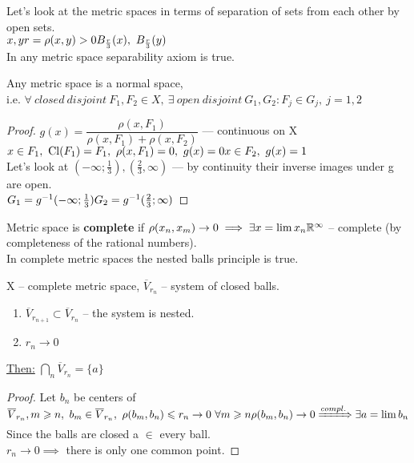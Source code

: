 Let's look at the metric spaces in terms of separation of sets from each other by open sets. \\
$x, y \\
r = \rho(x, y) > 0 \\
B_{\frac{r}{3}}(x),\ B_{\frac{r}{3}}(y)$ \\
In any metric space separability axiom is true.
\begin{thm}
  Any metric space is a normal space, \\i.e.
  $\forall\ closed\ disjoint\ F_1, F_2 \in X,\ \exists\ open\ disjoint\ G_1, G_2\colon F_j \in G_j,\ j = 1, 2$
\end{thm}
\begin{proof}
  $g(x) = \dfrac{\rho(x, F_1)}{\rho(x, F_1) + \rho(x, F_2)}$ --- continuous on X \\
  $x \in F_1,\ \operatorname{Cl}({F_1}) = F_1,\ \rho(x, F_1) = 0,\ g(x) = 0 \\
  x \in F_2,\ g(x) = 1$ \\
  Let's look at $(-\infty; \frac{1}{3}), (\frac{2}{3}, \infty)$ --- by continuity their inverse images under g are open. \\
  $G_1 = g^{-1}(-\infty; \frac{1}{3}) \\
  G_2 = g^{-1}(\frac{2}{3}; \infty)$
\end{proof}
\begin{defn}
  Metric space is \textbf{complete} if $\rho(x_n, x_m) \to 0 \implies \exists x = \lim x_n \\
  \mathbb{R}^\infty$ -- complete (by completeness of the rational numbers). \\
  In complete metric spaces the nested balls principle is true.
\end{defn}
\begin{thm}
  X -- complete metric space, $\overline{V}_{r_n}$ -- system of closed balls.
  \begin{enumerate}
      \item $\overline{V}_{r_{n + 1}} \subset \overline{V}_{r_n}$ -- the system is nested.
      \item $r_n \to 0$
    \end{enumerate}
  \underline{Then:} $\bigcap\limits_n \overline{V}_{r_n} = \{a\}$
\end{thm}
\begin{proof}
  Let $b_n$ be centers of $\overline{V}_{r_n}, \\
  m \geq n,\ b_m \in \overline{V}_{r_n},\ \rho(b_m, b_n) \leq r_n \to 0\ \forall m \geq n \\
  \rho(b_m, b_n) \to 0 \xRightarrow{compl.} \exists a = \lim b_n$
  Since the balls are closed a $\in$ every ball. \\
  $r_n \to 0 \implies$ there is only one common point.
\end{proof}
